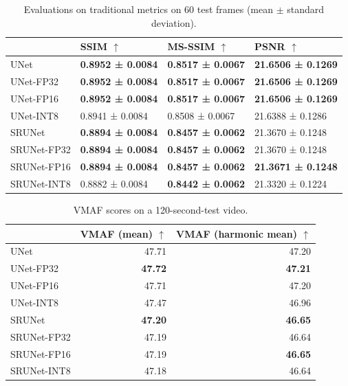 \begin{table}[t]
\begin{tabular}{llll}
\toprule
{} & SSIM $\uparrow$ & MS-SSIM $\uparrow$ & PSNR $\uparrow$ \\
\midrule
UNet        &  \textbf{0.8952 ± 0.0084} &  \textbf{0.8517 ± 0.0067} &  \textbf{21.6506 ± 0.1269} \\
UNet-FP32   &  \textbf{0.8952 ± 0.0084} &  \textbf{0.8517 ± 0.0067} &  \textbf{21.6506 ± 0.1269} \\
UNet-FP16   &  \textbf{0.8952 ± 0.0084} &  \textbf{0.8517 ± 0.0067} &  \textbf{21.6506 ± 0.1269} \\
UNet-INT8   &  0.8941 ± 0.0084 &  0.8508 ± 0.0067 &  21.6388 ± 0.1286 \\
\midrule
SRUNet      &  \textbf{0.8894 ± 0.0084} &  \textbf{0.8457 ± 0.0062} &  21.3670 ± 0.1248 \\
SRUNet-FP32 &  \textbf{0.8894 ± 0.0084} &  \textbf{0.8457 ± 0.0062} &  21.3670 ± 0.1248 \\
SRUNet-FP16 &  \textbf{0.8894 ± 0.0084} &  \textbf{0.8457 ± 0.0062} &  \textbf{21.3671 ± 0.1248} \\
SRUNet-INT8 &  0.8882 ± 0.0084 &  \textbf{0.8442 ± 0.0062} &  21.3320 ± 0.1224 \\
\bottomrule
\end{tabular}
\caption{Evaluations on traditional metrics on 60 test frames (mean $\pm$ standard deviation).}
\label{tab:traditional-metrics}
\end{table}

\begin{table}[t]
\begin{tabular}{lrr}
\toprule
{} &       VMAF (mean) $\uparrow$ &  VMAF (harmonic mean) $\uparrow$ \\
\midrule
UNet        &  47.71 &      47.20 \\
UNet-FP32   &  \textbf{47.72} &      \textbf{47.21} \\
UNet-FP16   &  47.71 &      47.20 \\
UNet-INT8   &  47.47 &      46.96 \\
\midrule
SRUNet      &  \textbf{47.20} &      \textbf{46.65} \\
SRUNet-FP32 &  47.19 &      46.64 \\
SRUNet-FP16 &  47.19 &      \textbf{46.65} \\
SRUNet-INT8 &  47.18 &      46.64 \\
\bottomrule
\end{tabular}
\caption{VMAF scores on a 120-second-test video.}
\label{tab:vmaf}
\end{table}

